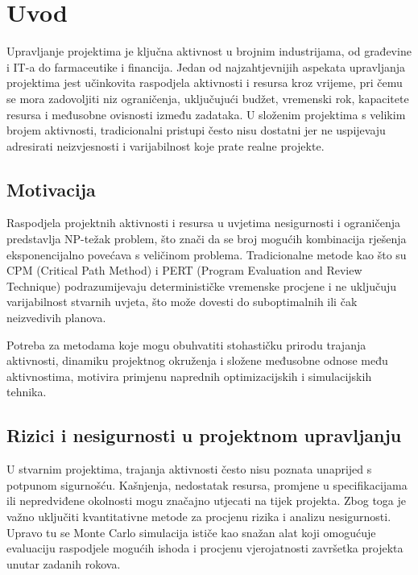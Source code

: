 \section{Uvod}

Upravljanje projektima je ključna aktivnost u brojnim industrijama, od građevine i IT-a do farmaceutike i financija. Jedan od najzahtjevnijih aspekata upravljanja projektima jest učinkovita raspodjela aktivnosti i resursa kroz vrijeme, pri čemu se mora zadovoljiti niz ograničenja, uključujući budžet, vremenski rok, kapacitete resursa i međusobne ovisnosti između zadataka. U složenim projektima s velikim brojem aktivnosti, tradicionalni pristupi često nisu dostatni jer ne uspijevaju adresirati neizvjesnosti i varijabilnost koje prate realne projekte.

\subsection{Motivacija}

Raspodjela projektnih aktivnosti i resursa u uvjetima nesigurnosti i ograničenja predstavlja NP-težak problem, što znači da se broj mogućih kombinacija rješenja eksponencijalno povećava s veličinom problema. Tradicionalne metode kao što su CPM (Critical Path Method) i PERT (Program Evaluation and Review Technique) podrazumijevaju determinističke vremenske procjene i ne uključuju varijabilnost stvarnih uvjeta, što može dovesti do suboptimalnih ili čak neizvedivih planova.

Potreba za metodama koje mogu obuhvatiti stohastičku prirodu trajanja aktivnosti, dinamiku projektnog okruženja i složene međusobne odnose među aktivnostima, motivira primjenu naprednih optimizacijskih i simulacijskih tehnika.

\subsection{Rizici i nesigurnosti u projektnom upravljanju}

U stvarnim projektima, trajanja aktivnosti često nisu poznata unaprijed s potpunom sigurnošću. Kašnjenja, nedostatak resursa, promjene u specifikacijama ili nepredviđene okolnosti mogu značajno utjecati na tijek projekta. Zbog toga je važno uključiti kvantitativne metode za procjenu rizika i analizu nesigurnosti. Upravo tu se Monte Carlo simulacija ističe kao snažan alat koji omogućuje evaluaciju raspodjele mogućih ishoda i procjenu vjerojatnosti završetka projekta unutar zadanih rokova.

